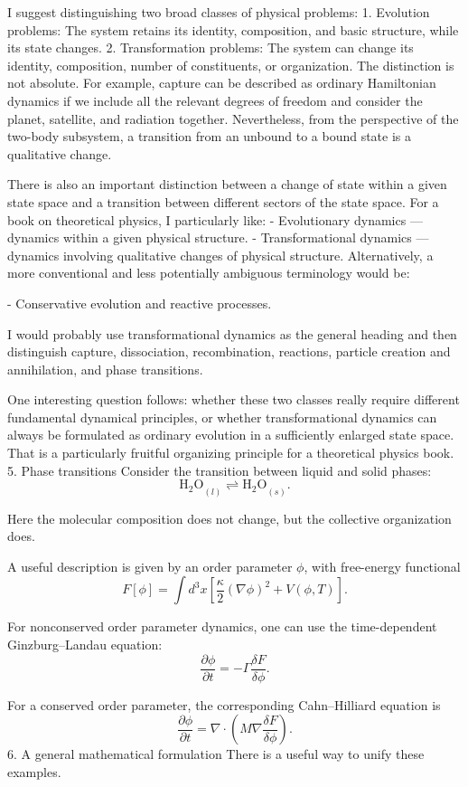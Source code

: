 I suggest distinguishing two broad classes of physical problems:
1. Evolution problems: The system retains its identity, composition, and basic structure, while its state changes.
2. Transformation problems: The system can change its identity, composition, number of constituents, or organization.
The distinction is not absolute. For example, capture can be described as ordinary Hamiltonian dynamics if we include all the relevant degrees of freedom and consider the planet, satellite, and radiation together. Nevertheless, from the perspective of the two-body subsystem, a transition from an unbound to a bound state is a qualitative change.

There is also an important distinction between a change of state within a given state space and a transition between different sectors of the state space.
For a book on theoretical physics, I particularly like:
- Evolutionary dynamics — dynamics within a given physical structure.
- Transformational dynamics — dynamics involving qualitative changes of physical structure.
Alternatively, a more conventional and less potentially ambiguous terminology would be:

- Conservative evolution and reactive processes.

I would probably use transformational dynamics as the general heading and then distinguish capture, dissociation, recombination, reactions, particle creation and annihilation, and phase transitions.

One interesting question follows: whether these two classes really require different fundamental dynamical principles, or whether transformational dynamics can always be formulated as ordinary evolution in a sufficiently enlarged state space. That is a particularly fruitful organizing principle for a theoretical physics book.
5. Phase transitions
Consider the transition between liquid and solid phases:
\[
\mathrm{H_2O}_{(l)}
\rightleftharpoons
\mathrm{H_2O}_{(s)}.
\]

Here the molecular composition does not change, but the collective organization does.

A useful description is given by an order parameter \(\phi\), with free-energy functional
\[
F[\phi]
=
\int d^3x
\left[
\frac{\kappa}{2}(\nabla\phi)^2
+V(\phi,T)
\right].
\]

For nonconserved order parameter dynamics, one can use the time-dependent Ginzburg–Landau equation:
\[
\frac{\partial\phi}{\partial t}
=
-\Gamma\frac{\delta F}{\delta\phi}.
\]

For a conserved order parameter, the corresponding Cahn–Hilliard equation is
\[
\frac{\partial\phi}{\partial t}
=
\nabla\cdot
\left(
M\nabla\frac{\delta F}{\delta\phi}
\right).
\]
6. A general mathematical formulation
There is a useful way to unify these examples.

